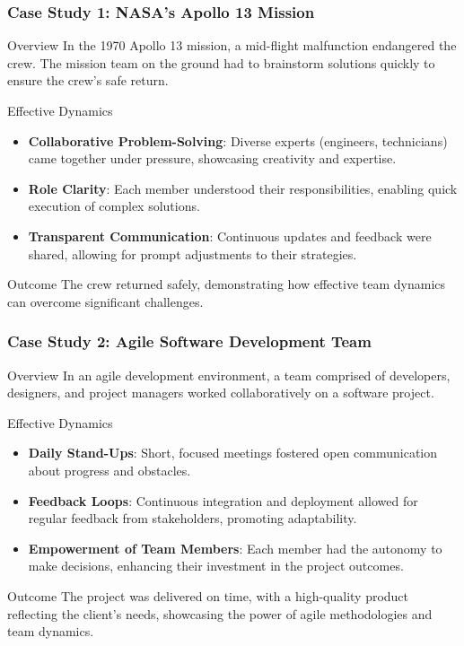 \documentclass[aspectratio=169]{beamer}
\begin{document}
\begin{frame}[fragile]
    \frametitle{Case Study 1: NASA's Apollo 13 Mission}
    \begin{block}{Overview}
        In the 1970 Apollo 13 mission, a mid-flight malfunction endangered the crew. The mission team on the ground had to brainstorm solutions quickly to ensure the crew’s safe return.
    \end{block}
    
    \begin{block}{Effective Dynamics}
        \begin{itemize}
            \item \textbf{Collaborative Problem-Solving}: Diverse experts (engineers, technicians) came together under pressure, showcasing creativity and expertise.
            \item \textbf{Role Clarity}: Each member understood their responsibilities, enabling quick execution of complex solutions.
            \item \textbf{Transparent Communication}: Continuous updates and feedback were shared, allowing for prompt adjustments to their strategies.
        \end{itemize}
    \end{block}

    \begin{block}{Outcome}
        The crew returned safely, demonstrating how effective team dynamics can overcome significant challenges.
    \end{block}
\end{frame}

\begin{frame}[fragile]
    \frametitle{Case Study 2: Agile Software Development Team}
    \begin{block}{Overview}
        In an agile development environment, a team comprised of developers, designers, and project managers worked collaboratively on a software project.
    \end{block}
    
    \begin{block}{Effective Dynamics}
        \begin{itemize}
            \item \textbf{Daily Stand-Ups}: Short, focused meetings fostered open communication about progress and obstacles.
            \item \textbf{Feedback Loops}: Continuous integration and deployment allowed for regular feedback from stakeholders, promoting adaptability.
            \item \textbf{Empowerment of Team Members}: Each member had the autonomy to make decisions, enhancing their investment in the project outcomes.
        \end{itemize}
    \end{block}

    \begin{block}{Outcome}
        The project was delivered on time, with a high-quality product reflecting the client’s needs, showcasing the power of agile methodologies and team dynamics.
    \end{block}
\end{frame}
\end{document}
